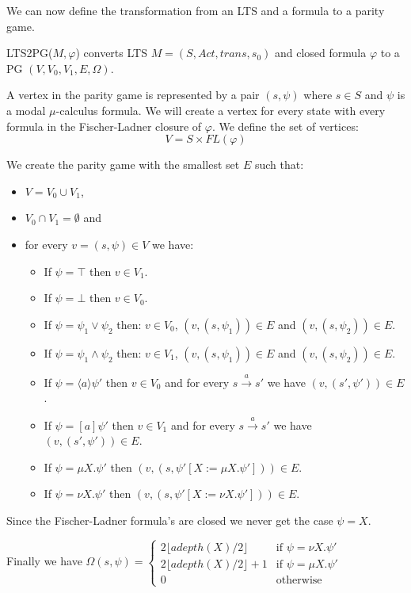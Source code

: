 We can now define the transformation from an LTS and a formula to a parity game.
\begin{definition}
	\label{def_LTS2PG}\cite{Bradfield2018}
	LTS2PG($M, \varphi$) converts LTS $M = (S, Act, trans, s_0)$ and closed formula $\varphi$ to a PG $(V, V_0, V_1, E, \Omega)$.
	
	A vertex in the parity game is represented by a pair $(s, \psi)$ where $s \in S$ and $\psi$ is a modal $\mu$-calculus formula. We will create a vertex for every state with every formula in the Fischer-Ladner closure of $\varphi$. We define the set of vertices:
	\[ V = S \times \textit{FL}(\varphi) \]
	
	We create the parity game with the smallest set $E$ such that:
	\begin{itemize}
		\item $V = V_0 \cup V_1$,
		\item $V_0 \cap V_1 = \emptyset$ and
		\item for every $v = (s, \psi) \in V$ we have:
		\begin{itemize}
			\item If $\psi = \top$ then $v \in V_1$.
			\item If $\psi = \bot$ then $v \in V_0$.
			\item If $\psi = \psi_1 \vee \psi_2$ then:
			\subitem $v \in V_0$,
			\subitem $(v, (s,\psi_1)) \in E$ and
			\subitem $(v, (s,\psi_2)) \in E$.
			\item If $\psi = \psi_1 \wedge \psi_2$ then:
			\subitem $v \in V_1$,
			\subitem $(v, (s,\psi_1)) \in E$ and
			\subitem $(v, (s,\psi_2)) \in E$.
			\item If $\psi = \langle a \rangle \psi'$ then $v \in V_0$ and for every $s \xrightarrow{ a} s'$ we have $(v, (s', \psi')) \in E$.
			\item If $\psi = [ a ] \psi'$ then $v \in V_1$ and for every $s \xrightarrow{ a} s'$ we have  $(v, (s', \psi')) \in E$.
			\item If $\psi = \mu X. \psi'$ then $(v, (s, \psi'[X:=\mu X. \psi'])) \in E$.
			\item If $\psi = \nu X. \psi'$ then $(v, (s, \psi'[X:=\nu X. \psi'])) \in E$.
		\end{itemize}
	\end{itemize}
	Since the Fischer-Ladner formula's are closed we never get the case $\psi = X$.
	
	Finally we have $\Omega(s, \psi) = \begin{cases}
	2 \lfloor adepth(X) / 2 \rfloor & \text{if } \psi = \nu X. \psi'\\
	2 \lfloor adepth(X) / 2 \rfloor + 1 & \text{if } \psi = \mu X. \psi'\\
	0 & \text{otherwise}
	\end{cases}$
\end{definition}
